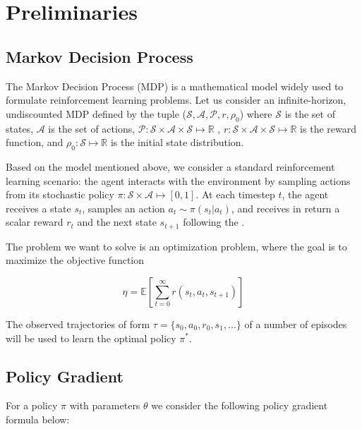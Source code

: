 \section{Preliminaries}
\label{sec:preleminaries}


\subsection{Markov Decision Process}
The Markov Decision Process (MDP) is a mathematical model widely used to formulate reinforcement learning problems. Let us consider an infinite-horizon, undiscounted MDP defined by the tuple ($\mathcal{S}, \mathcal{A}, \mathcal{P}, r, \rho_0$) where $\mathcal{S}$ is the set of states, $\mathcal{A}$ is the set of actions, $\mathcal{P}: \mathcal{S}\times\mathcal{A}\times\mathcal{S}\mapsto \mathbb{R}$ , $r: \mathcal{S}\times\mathcal{A}\times\mathcal{S} \mapsto \mathbb{R}$ is the reward function, and $\rho_0:\mathcal{S}\mapsto\mathbb{R}$ is the initial state distribution.

Based on the model mentioned above, we consider a standard reinforcement learning scenario: the agent interacts with the environment by sampling actions from its stochastic policy $\pi:\mathcal{S}\times\mathcal{A}\mapsto[0,1]$. At each timestep $t$, the agent receives a state $s_t$, samples an action $a_t \sim \pi(s_t | a_t)$, and receives in return a scalar reward $r_t$ and the next state $s_{t+1}$ following the . 

The problem we want to solve is an optimization problem, where the goal is to maximize the objective function 

\[
\eta = \mathbb{E}
\left[ \sum_{t=0}^{\infty}r(s_t, a_t, s_{t+1})\right]
\] 

The observed trajectories of form $\tau = \{s_0, a_0, r_0, s_1, ... \}$ of a number of episodes will be used to learn the optimal policy $\pi^*$. 


\subsection{Policy Gradient}
For a policy $\pi$ with parameters $\theta$ we consider the following policy gradient 
formula below:

